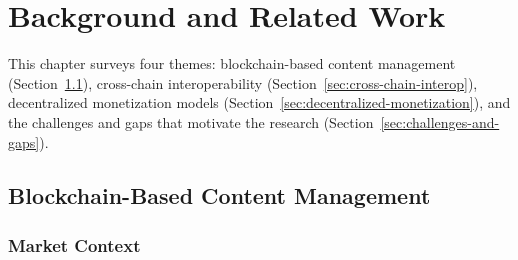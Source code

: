 
\chapter{Background and Related Work}\label{chap:background}

This chapter surveys four themes: blockchain-based content management (Section~\ref{sec:blockchain-content-management}), cross-chain interoperability (Section~\ref{sec:cross-chain-interop}), decentralized monetization models (Section~\ref{sec:decentralized-monetization}), and the challenges and gaps that motivate the research (Section~\ref{sec:challenges-and-gaps}).

\section{Blockchain-Based Content Management}\label{sec:blockchain-content-management}

\subsection{Market Context}\label{subsec:market-context}

